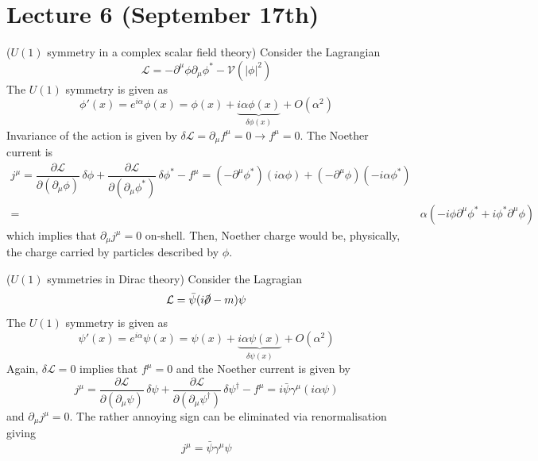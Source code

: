 \section{Lecture 6 (September 17th)}
\begin{ex}
($U(1)$ symmetry in a complex scalar field theory) Consider the Lagrangian 
\[\mathcal{L}=-\partial ^{\mu }\phi \partial _{\mu }\phi ^{*}-\mathcal{V}(|\phi |^2)\]
The $U(1)$ symmetry is given as
\[\phi '(x)=e^{i\alpha }\phi (x)=\phi (x)+\underbrace{i\alpha \phi (x)}_{\delta \phi (x)}+O(\alpha ^2)\]
Invariance of the action is given by $\delta \mathcal{L}=\partial _{\mu }f^{\mu }=0\rightarrow f^{\mu }=0$. The Noether current is
\[\begin{align*}
j^{\mu }=\dfrac{\partial \mathcal{L}}{\partial (\partial _{\mu }\phi )}\,\delta \phi + \dfrac{\partial \mathcal{L}}{\partial (\partial _{\mu }\phi ^{*})}\,\delta \phi ^{*}-f^{\mu }=(-\partial ^{\mu }\phi ^{*})(i\alpha \phi )+(-\partial ^{\mu }\phi )(-i\alpha \phi ^{*})\\
=&\alpha (-i\phi \partial ^{\mu }\phi ^{*}+i\phi ^{*}\partial ^{\mu }\phi )
\end{align*}\]
which implies that $\partial _{\mu }j^{\mu }=0$ on-shell. Then, Noether charge would be, physically, the charge carried by particles described by $\phi $.
\end{ex}
\vspace{2ex}
\begin{ex}
($U(1)$ symmetries in Dirac theory) Consider the Lagragian
\[\mathcal{L}=\bar{\psi  }(i\cancel{\partial }-m)\psi \]
The $U(1)$ symmetry is given as
\[\psi '(x)=e^{i\alpha }\psi (x)=\psi (x)+\underbrace{i\alpha \psi (x)}_{\delta \psi (x)}+O(\alpha ^2)\]
Again, $\delta \mathcal{L}=0$ implies that $f^{\mu }=0$ and the Noether current is given by
\[j^{\mu }=\dfrac{\partial \mathcal{L}}{\partial (\partial _{\mu }\psi )}\,\delta \psi +\dfrac{\partial \mathcal{L}}{\partial (\partial _{\mu }\psi ^{\dagger})}\,\delta \psi^{\dagger}-f^{\mu }=i\bar{\psi}\gamma ^{\mu }(i\alpha \psi )  \]
and $\partial _{\mu }j^{\mu }=0$. The rather annoying sign can be eliminated via renormalisation giving
\[j^{\mu }=\bar{\psi }\gamma ^{\mu }\psi \]
\end{ex}
\vspace{2ex}

